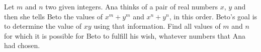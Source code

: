 Let $m$ and $n$ two given integers. Ana thinks of a pair of real numbers $x$, $y$ and then she tells Beto the values of $x^m+y^m$ and $x^n+y^n$, in this order. Beto's goal is to determine the value of $xy$ using that information. Find all values of $m$ and $n$ for which it is possible for Beto to fulfill his wish, whatever numbers that Ana had chosen.